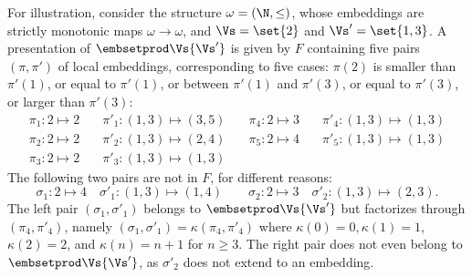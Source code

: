 \begin{slexample}\label{eg:pair of emb}
For illustration,
consider the structure ${\omega = (\N, \leq)}$, 
whose embeddings are strictly monotonic maps $\omega\to\omega$, and 
$\Vs=\set{2}$ and $\Vs'=\set{1,3}$.
A presentation of $\embsetprod \Vs {\Vs'}$ is given by $F$ containing five pairs
$(\pi,\pi')$ of local embeddings, corresponding to five cases: 
$\pi(2)$ is smaller
than $\pi'(1)$, or equal to $\pi'(1)$, or between $\pi'(1)$ and $\pi'(3)$, or equal to $\pi'(3)$,
or larger than $\pi'(3)$:
\begin{align*}
\pi_1 : 2 {\mapsto} 2 & \quad \pi'_1 : (1,3){\mapsto}(3,5) & \quad 
\pi_4 : 2 {\mapsto} 3 & \quad \pi'_4 : (1,3){\mapsto}(1, 3) \\
\pi_2 : 2 {\mapsto} 2 & \quad \pi'_2 : (1,3){\mapsto}(2,4) & \quad
\pi_5 : 2 {\mapsto} 4 & \quad \pi'_5 : (1,3){\mapsto}(1, 3) \\
\pi_3 : 2 {\mapsto} 2 & \quad  \pi'_3 : (1,3){\mapsto}(1,3) 
\end{align*}
The following two pairs are not in $F$, for different reasons:
\[
\sigma_1 : 2 {\mapsto} 4 \quad \sigma'_1 : (1,3){\mapsto}(1,4)
\qquad
\sigma_2 : 2 {\mapsto} 3 \quad \sigma'_2 : (1,3){\mapsto}(2,3).
\]
The left pair $(\sigma_1, \sigma'_1)$ belongs to $\embsetprod \Vs  {\Vs'}$ but factorizes through 
$(\pi_4, \pi'_4)$, namely
$(\sigma_1, \sigma'_1) = \kappa(\pi_4, \pi'_4)$ where 
$\kappa(0)=0, \kappa(1)=1$, $\kappa(2)=2$, and $\kappa(n) = n+1$ for $n\geq 3$.
The right pair does not even belong to $\embsetprod \Vs {\Vs'}$, as $\sigma'_2$ does not extend to an embedding.
\end{slexample}

